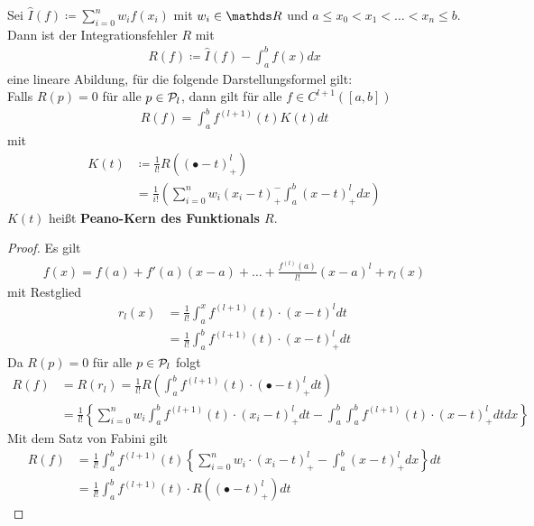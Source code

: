 \documentclass[ngerman,fontsize=11pt, paper=a4, parskip=half, titlepage=true, toc=bib]{scrbook}
\begin{document}
\begin{Satze}
  Sei $\hat{I}(f)\coloneqq \sum_{i=0}^n w_if(x_i)$ mit $w_i\in\R$ und
  $a\leq x_0<x_1<\ldots <x_n\leq b$.
  Dann ist der Integrationsfehler $R$ mit 
  \begin{gather}
    R(f) \coloneqq \hat{I}(f) - \int_a^b f(x) dx
    \label{VII.2.5}
  \end{gather}
  eine lineare Abildung, für die folgende Darstellungsformel gilt:
  \\
  Falls $R(p)=0$ für alle $p\in\mathcal{P}_l$, dann gilt 
  für alle $f\in C^{l+1}([a,b])$
  \begin{gather}
    R(f) = \int_a^bf^{(l+1)}(t) K(t) dt
    \label{VII.2.6}
  \end{gather}
  mit 
  \begin{align}\nonumber
    K(t) &\coloneqq \frac{1}{l!}
           R\left( 
           (\bullet -t)_+^l
           \right)\\
         &= \frac{1}{i!}\left( \sum_{i=0}^n w_i(x_i-t)_+^-\int_a^b(x-t)_+^ldx  \right)
           \label{VII.2.7}
  \end{align}
  $K(t)$ heißt \textbf{Peano-Kern des Funktionals
    $R$}.
  \begin{proof}
    Es gilt
    \begin{gather*}
      f(x) = f(a) + f'(a)(x-a) +\ldots + \frac{f^{(l)}(a)}{l!}(x-a)^l + r_l(x)
    \end{gather*}
    mit Restglied 
    \begin{align*}
      r_l(x) &= \frac{1}{l!} \int_a^xf^{(l+1)} (t)\cdot (x-t)^l dt\\
             &= \frac{1}{l!} \int_a^bf^{(l+1)} (t)\cdot (x-t)_+^l dt
    \end{align*}
    Da $R(p)=0$ für alle $p\in\mathcal{P}_l$ folgt
    \begin{align*}
      R(f) &= R(r_l)
             = \frac{1}{l!} R\left(\int_a^bf^{(l+1)} (t)\cdot(\bullet-t)_+^l
             dt\right)\\
           &=\frac{1}{l!}\left\{ \sum_{i=0}^n w_i \int_a^b f^{(l+1)}(t)
             \cdot (x_i-t)_+^ldt  
             - \int_a^b\int_a^b  f^{(l+1)}(t) \cdot (x-t)_+^ldtdx  \right\}
    \end{align*}
    Mit dem Satz von Fabini gilt
    \begin{align*}
      R(f) &= \frac{1}{l!}\int_a^bf^{(l+1)}(t) 
             \left\{ 
             \sum_{i=0}^n w_i  \cdot (x_i-t)_+^l  
             - \int_a^b(x-t)_+^ldx  \right\}
             dt\\
           &= \frac{1}{l!} \int_a^bf^{(l+1)}(t) 
             \cdot R\left( (\bullet -t)_+^l\right) dt    
    \end{align*}
  \end{proof}
\end{Satze}
\end{document}
